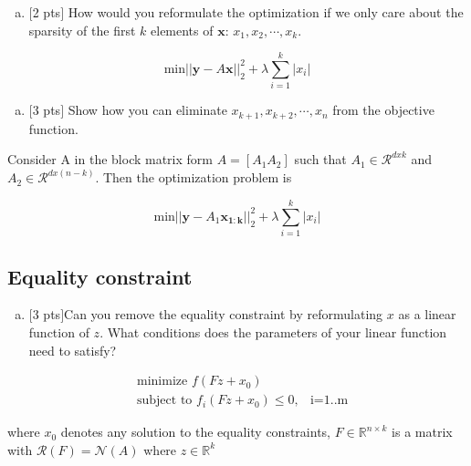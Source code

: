 \documentclass[12pt]{article}
\begin{document}
\begin{enumerate}[(a)]
\item 
$[$2 pts$]$ How would you reformulate the optimization if we only care about the sparsity of the first $k$ elements of $\mathbf{x}$: $x_{1},x_{2},\cdots,x_{k}$. 
\end{enumerate}

\begin{equation}
	\text{min}||\mathbf{y}-A\mathbf{x}||_{2}^{2}+\lambda \sum_{i=1}^{k} |x_i|
	\label{lasso}
	\nonumber
\end{equation}


\vspace{.25cm}

\begin{enumerate}[(b)]
\item 
$[$3 pts$]$ Show how you can eliminate $x_{k+1},x_{k+2},\cdots,x_{n}$ from the objective function.
\end{enumerate}

Consider A in the block matrix form $A = [A_1 A_2]$ such that $A_1 \in \mathcal{R}^{dxk}$ and $A_2 \in \mathcal{R}^{dx(n-k)}$. Then the optimization problem is 

\begin{equation}
	\text{min}||\mathbf{y}-A_1\mathbf{x_{1:k}}||_{2}^{2}+\lambda \sum_{i=1}^{k} |x_i|
	\label{lasso}
	\nonumber
\end{equation}


\vspace{.25cm}

\subsection{Equality constraint}

\begin{enumerate}[(a)]
\item 
$[$3 pts$]$Can you remove the equality constraint by reformulating $x$ as a linear function of $z$. What conditions does the parameters of your linear function need to satisfy?
\end{enumerate}

\begin{eqnarray*}
&\text{minimize   } f(Fz+x_0)\\
&\text{subject to   } f_i(Fz+x_0) \leq 0, & \text{i=1..m}
\end{eqnarray*}

where $x_0$ denotes any solution to the equality constraints, $F \in \mathbb{R}^{n\times k }$ is a matrix with $\mathcal{R}(F) = \mathcal{N}(A)$ where $z \in \mathbb{R}^k$
\end{document}
